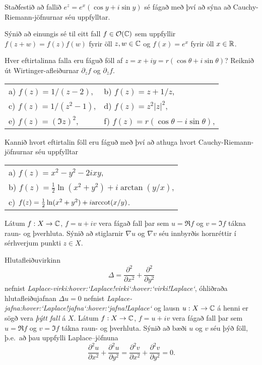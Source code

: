 \vfill\eject


\aefing

\daemi  Staðfestið að fallið $e^z=e^x(\cos y+i\sin y)$ sé fágað með því
að sýna að Cauchy-Riemann-jöfnurnar séu uppfylltar.

\daemi
 Sýnið að einungis sé til eitt fall $f\in {\cal O}({\mathbb C})$ sem uppfyllir
$f(z+w)=f(z)f(w)$ fyrir öll $z,w\in {\mathbb C}$ og $f(x)=e^x$ fyrir öll $x\in
{\mathbb R}$. 

\daemi Hver eftirtalinna falla eru fáguð föll af 
$z=x+iy=r(\cos {\theta} +i\sin {\theta})$?  
Reiknið út Wirtinger-afleiðurnar $\partial_z f$  og 
$\partial_{\bar z}f$.

\smallskip\noindent
\begin{tabular}{ll}
a) $f(z)= 1/(z-2)$,
&b) $f(z)= z+1/z$, \\
c) $f(z)= 1/(z^2-1)$,
&d) $f(z)= z^2|z|^2$,\\
e) $f(z)= (\Im z)^2$,
&f) $f(z)= r(\cos {\theta}-i\sin {\theta})$,
\end{tabular}

\daemi Kannið hvort eftirtalin föll eru fáguð með því að athuga hvort
Cauchy-Riemann- jöfnurnar séu uppfylltar

\begin{tabular}{l}
a) $f(z)=x^2-y^2-2ixy$, \\
b) $f(z)=\frac 12\ln(x^2+y^2)+i\arctan(y/x)$,\\
c) $f(z)=\frac 12\ln(x^2+y^2)+i{\operatorname{arccot}}(x/y)$.
\end{tabular}

\daemi Látum $f: X\to {\mathbb C}$, $f=u+iv$ vera fágað fall þar sem $u=\Re f$
og $v=\Im f$ tákna raun- og þverhluta.  
Sýnið að stiglarnir $\nabla u$ og $\nabla v$ séu innbyrðis 
hornréttir í sérhverjum punkti $z\in X$.


\daemi Hlutafleiðuvirkinn
$$
{\Delta}=\dfrac {\partial^2 }{\partial x^2}+  
\dfrac {\partial^2 }{\partial y^2}
$$
nefnist {\it Laplace-virki:hover:`Laplace!virki`:hover:`virki!Laplace`},
óhliðraða hlutafleiðujafnan
${\Delta}u=0$ nefnist {\it
Laplace-jafna:hover:`Laplace!jafna`:hover:`jafna!Laplace`}
og lausn $u:X\to {\mathbb C}$ á  henni er sögð vera {\it þýtt fall} á $X$.
Látum $f: X\to {\mathbb C}$, $f=u+iv$ vera fágað fall þar sem $u=\Re f$
og $v=\Im f$ tákna raun- og þverhluta. 
 Sýnið að bæði $u$ og $v$ séu
þýð föll, þ.e.~að þau uppfylli Laplace--jöfnuna
$$
\dfrac {\partial^2 u}{\partial x^2}+  
\dfrac {\partial^2 u}{\partial y^2}=  
\dfrac {\partial^2 v}{\partial x^2}+  
\dfrac {\partial^2 v}{\partial y^2}=0.
$$

